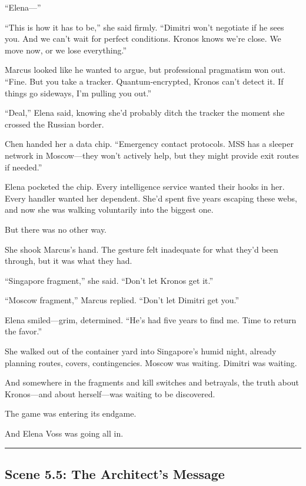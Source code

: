 ``Elena---''

``This is how it has to be,'' she said firmly. ``Dimitri won't negotiate if he sees you. And we can't wait for perfect conditions. Kronos knows we're close. We move now, or we lose everything.''

Marcus looked like he wanted to argue, but professional pragmatism won out. ``Fine. But you take a tracker. Quantum-encrypted, Kronos can't detect it. If things go sideways, I'm pulling you out.''

``Deal,'' Elena said, knowing she'd probably ditch the tracker the moment she crossed the Russian border.

Chen handed her a data chip. ``Emergency contact protocols. MSS has a sleeper network in Moscow---they won't actively help, but they might provide exit routes if needed.''

Elena pocketed the chip. Every intelligence service wanted their hooks in her. Every handler wanted her dependent. She'd spent five years escaping these webs, and now she was walking voluntarily into the biggest one.

But there was no other way.

She shook Marcus's hand. The gesture felt inadequate for what they'd been through, but it was what they had.

``Singapore fragment,'' she said. ``Don't let Kronos get it.''

``Moscow fragment,'' Marcus replied. ``Don't let Dimitri get you.''

Elena smiled---grim, determined. ``He's had five years to find me. Time to return the favor.''

She walked out of the container yard into Singapore's humid night, already planning routes, covers, contingencies. Moscow was waiting. Dimitri was waiting.

And somewhere in the fragments and kill switches and betrayals, the truth about Kronos---and about herself---was waiting to be discovered.

The game was entering its endgame.

And Elena Voss was going all in.

\begin{center}\rule{0.5\linewidth}{0.5pt}\end{center}

\hypertarget{scene-5.5-the-architects-message}{%
\subsection{Scene 5.5: The Architect's Message}\label{scene-5.5-the-architects-message}}

